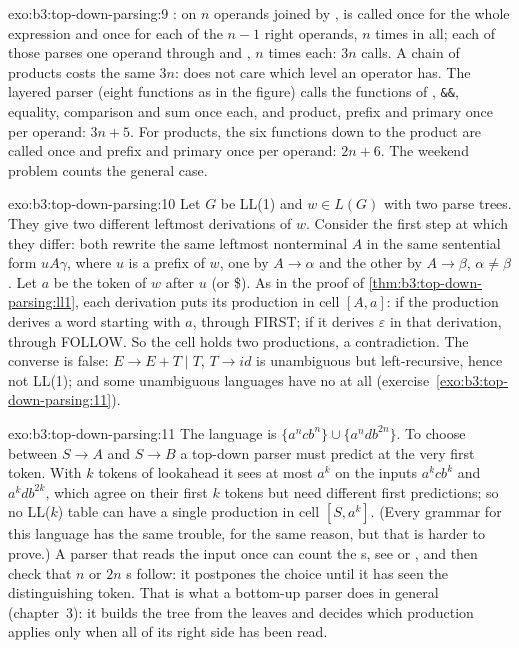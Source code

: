 \begin{solution}{exo:b3:top-down-parsing:9}
: on $n$ operands joined by \code{+},  is called once for the whole expression and once for each of the $n - 1$ right operands, $n$ times in all; each of those parses one operand through  and , $n$ times each: $3n$ calls. A chain of products costs the same $3n$:  does not care which level an operator has. The layered parser (eight functions as in the figure) calls the functions of \code{||}, \texttt{\&\&}, equality, comparison and sum once each, and product, prefix and primary once per operand: $3n + 5$. For products, the six functions down to the product are called once and prefix and primary once per operand: $2n + 6$. The weekend problem counts the general case.
\end{solution}

\begin{solution}{exo:b3:top-down-parsing:10}
Let $G$ be LL(1) and $w \in L(G)$ with two parse trees. They give two different leftmost derivations of $w$. Consider the first step at which they differ: both rewrite the same leftmost nonterminal $A$ in the same sentential form $u A \gamma$, where $u$ is a prefix of $w$, one by $A \to \alpha$ and the other by $A \to \beta$, $\alpha \ne \beta$. Let $a$ be the token of $w$ after $u$ (or \$). As in the proof of \cref{thm:b3:top-down-parsing:ll1}, each derivation puts its production in cell $[A, a]$: if the production derives a word starting with $a$, through FIRST; if it derives $\varepsilon$ in that derivation, through FOLLOW. So the cell holds two productions, a contradiction. The converse is false: $E \to E + T \mid T$, $T \to \mathit{id}$ is unambiguous but left-recursive, hence not LL(1); and some unambiguous languages have no  at all (exercise~\ref{exo:b3:top-down-parsing:11}).
\end{solution}

\begin{solution}{exo:b3:top-down-parsing:11}
The language is $\{a^n c b^n\} \cup \{a^n d b^{2n}\}$. To choose between $S \to A$ and $S \to B$ a top-down parser must predict at the very first token. With $k$ tokens of lookahead it sees at most $a^k$ on the inputs $a^k c b^k$ and $a^k d b^{2k}$, which agree on their first $k$ tokens but need different first predictions; so no LL($k$) table can have a single production in cell $[S, a^k]$. (Every grammar for this language has the same trouble, for the same reason, but that is harder to prove.) A parser that reads the input once can count the s, see  or , and then check that $n$ or $2n$ s follow: it postpones the choice until it has seen the distinguishing token. That is what a bottom-up parser does in general (chapter~3): it builds the tree from the leaves and decides which production applies only when all of its right side has been read.
\end{solution}

